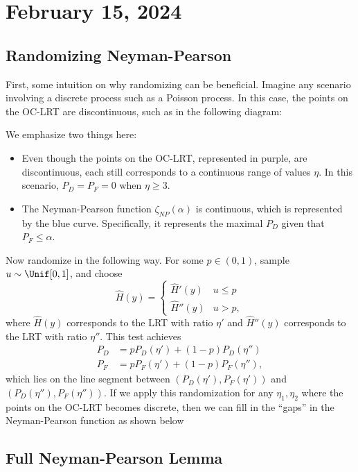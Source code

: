 \section{February 15, 2024}

\subsection{Randomizing Neyman-Pearson}

First, some intuition on why randomizing can be beneficial. Imagine any scenario involving a discrete process such as a Poisson process. In this case, the points on the OC-LRT are discontinuous, such as in the following diagram: 



\noindent We emphasize two things here:
\begin{itemize}
	\item Even though the points on the OC-LRT, represented in purple, are discontinuous, each still corresponds to a continuous range of values $\eta$. In this scenario, $P_D = P_F = 0$ when $\eta\geq 3$.  
	\item The Neyman-Pearson function $\zeta_{NP}(\alpha)$ is continuous, which is represented by the blue curve. Specifically, it represents the maximal $P_D$ given that $P_F\leq \alpha$.  
\end{itemize}

Now randomize in the following way. For some $p\in (0,1)$, sample $u\sim \Unif[0,1]$, and choose 
\[\hat{H}(y) = \begin{cases}
	\hat{H}'(y) & u\leq p \\
	\hat{H}''(y) & u > p,
\end{cases}\] 
where $\hat{H}(y)$ corresponds to the LRT with ratio $\eta'$ and $\hat{H}''(y)$ corresponds to the LRT with ratio $\eta''$.  
This test achieves
\begin{align*}
	P_D &= pP_D(\eta') + (1-p)P_D(\eta'') \\
	P_F &= pP_F(\eta') + (1-p)P_F(\eta''), 
\end{align*}
which lies on the line segment between $(P_D(\eta'), P_F(\eta'))$ and $(P_D(\eta''), P_F(\eta''))$. If we apply this randomization for any $\eta_1,\eta_2$ where the points on the OC-LRT becomes discrete, then we can fill in the ``gaps'' in the Neyman-Pearson function as shown below



\subsection{Full Neyman-Pearson Lemma}


